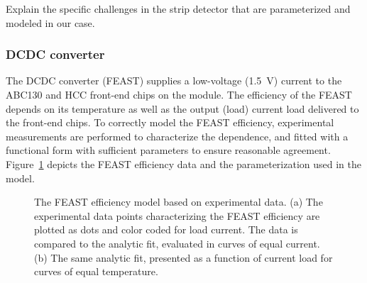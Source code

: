 
Explain the specific challenges in the strip detector that are parameterized and modeled
in our case.

\subsubsection{DCDC converter}

The DCDC converter (FEAST) supplies a low-voltage (1.5~V) current to the ABC130 and HCC front-end
chips on the module.
The efficiency of the FEAST depends on its temperature as well as the output (load) current
load delivered to the front-end chips. To correctly model the FEAST efficiency, experimental
measurements are performed to characterize the dependence, and fitted with a functional form with
sufficient parameters to ensure reasonable agreement. Figure~\ref{fig:feast_eff} depicts the
FEAST efficiency data and the parameterization used in the model.

\begin{figure}[ht]
\centering
{}
\caption{The FEAST efficiency model based on experimental data. (a) The experimental data points
characterizing the FEAST efficiency are plotted as dots and color coded for load current. The data is
compared to the analytic fit, evaluated in curves of equal current. (b) The same analytic fit,
presented as a function of current load for curves of equal temperature.
}
\label{fig:feast_eff}
\end{figure}


